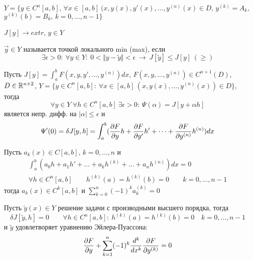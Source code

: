 \documentclass{article}
\begin{document}
$Y=\{y\in C^{n}[a,b], \, \forall x \in [a,b] \ (x,y(x), y'(x),\dots ,y^{(n)}(x) \in D, \, y^{(k)}=A_k,\,$ $ y^{(k)}(b)=B_k, \, k=0,\dots ,n-1\}$

$J[y]\to extr$, $y\in Y$
\begin{definition}
  $\vec{y} \in Y$ называется точкой локального min (max), если 
  \[
    \exists \epsilon >0: \: \forall y \in Y:\: 0 < \Vert y-\tilde{y} \Vert < \epsilon \ \rightarrow \ J[\tilde{y}]\le J[y] \ (\ge)
  \]
\end{definition}
\begin{lemma}
  \phantom{.}

  Пусть $J[y]=\int_{a}^{b}F(x,y,y',\dots ,y^{(n)})dx$, $F(x, y, \dots , y^{(n)}) \in C^{n+1}(D)$,
  $D\in \mathbb{R}^{n+2}$, $Y=\{y \in C^{n}[a,b]:\: \forall x \in [a,b] \ (x,y(x),\dots ,y^{(n)}(x))\in D\}$,
  тогда
  \[
    \forall y\in Y \; \forall h \in C^{n}[a,b] \ \exists \epsilon > 0: \: \Psi(\alpha)=J[y+\alpha h]
  \]
  является непр. дифф. на $|\alpha|\le \epsilon$ и
  \[
    \Psi'(0)=\delta J[y,h]=\int_{a}^{b}(\frac{\partial{F}}{\partial{y}}h+\frac{\partial{F}}{\partial{y'}}h'+\dots +\frac{\partial{F}}{\partial{y^{(n)}}}h^{(n)})dx
  \]
\end{lemma}
\begin{lemma}
  \phantom{.}

  Пусть $a_k(x) \in C[a,b]$, $k=0,\dots ,n$ и
  \begin{gather*}
    \int_{a}^{b}(a_0h+a_1h'+\dots +a_kh^{(k)}+\dots +a_nh^{(n)})dx=0 \\ 
    \forall h \in C^{n}[a,b] \qquad h^{(k)}(a)=h^{(k)}(b)=0 \qquad k=0,\dots ,n-1
  \end{gather*}
  тогда $a_k(x) \in C^{k}[a,b]$ и $\sum_{k=0}^{n}(-1)^{k}a_k^{(k)}=0$
\end{lemma}
\begin{theorem}
  Пусть $\tilde{y}(x) \in Y$ решение задачи с производными высшего порядка, тогда
  \[
    \delta J[\tilde{y}, h]=0 \qquad \forall h \in C^{n}[a,b]: \:
    h^{(k)}(a)=h^{(k)}(b)=0 \quad k=0,\dots ,n-1
  \]
  и $\tilde{y}$ удовлетворяет уравнению Эйлера-Пуассона:
  \[
    \frac{\partial{F}}{\partial{y}}+\sum_{k=1}^{n}(-1)^{k}\frac{d^{k}}{dx^{k}}\frac{\partial{F}}{\partial{y^{(k)}}}=0
  \]
\end{theorem}
\end{document}

